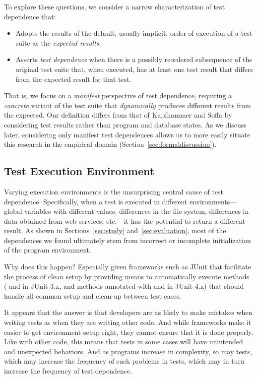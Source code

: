 To explore these questions, we consider a narrow characterization
of test dependence that:
\begin{itemize}
\item Adopts the results of the default, usually implicit,
  order of execution of a test suite as the \emph{expected results}. 
\item Asserts \emph{test dependence\/} when there is a possibly
  reordered subsequence of the original test suite that, when
  executed, has at least one test result that differs from the
  expected result for that test.  
\end{itemize}
That is, we focus on a \emph{manifest\/} perspective of test dependence,
requiring a \emph{concrete\/} variant of the test suite that
\emph{dynamically\/} produces different results from the expected.  Our
definition differs from that of Kapfhammer and Soffa by considering
test results rather than program and database states.
As we discuss later, considering only manifest test dependences allows
us to more easily situate this research in the empirical domain (Section~\ref{sec:formaldiscussion}).



\subsection{Test Execution Environment}

Varying execution environments is the unsurprising central
cause of test dependence. Specifically, when a
test is executed in different environments---global variables
with different values, differences in the file system, differences in
data obtained from web services, etc.---it has the potential to return
a different result.  
As shown in Sections~\ref{sec:study} and~\ref{sec:evaluation}, most of the dependences we found
ultimately stem from incorrect or incomplete initialization
of the program environment.

Why does this happen? Especially given frameworks such as
JUnit that facilitate the process of clean setup by providing means to
automatically execute methods ( and  in JUnit
3.x, and methods annotated with  and  in
JUnit 4.x) that should handle all common setup and clean-up between
test cases. 

It appears that the answer is that developers are as likely
to make mistakes when writing tests as when they are writing other code.
And while frameworks make it easier to get environment setup right, 
they cannot ensure that it is done properly. 
Like with other code, this means that tests in some cases will have
unintended and unexpected behaviors.  And as programs increase in complexity,
so may tests, which may increase the frequency of such problems in tests,
which may in turn increase the frequency of test dependence.

